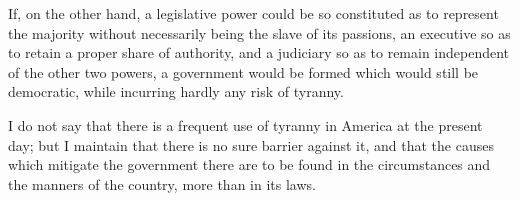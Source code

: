 If, on the other hand, a legislative power could be so
constituted as to represent the majority without necessarily being the
slave of its passions, an executive so as to retain a proper share of
authority, and a judiciary so as to remain independent of the other
two powers, a government  would be formed which would still
be democratic, while incurring hardly any risk of tyranny.

I do not say that there is a frequent use of tyranny in America at the
present day; but I maintain that there is no sure barrier against it,
and that the causes which mitigate the government there are to be
found in the circumstances and the manners of the country, more than
in its laws.


